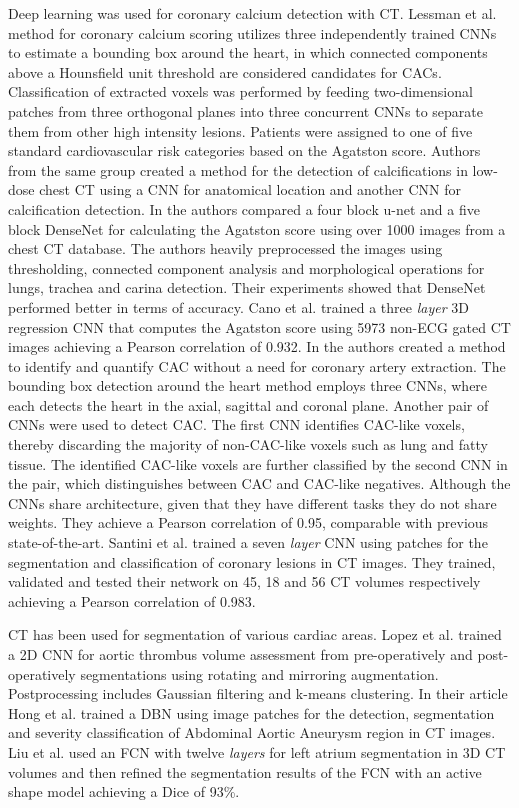 \documentclass[journal]{IEEEtran}
\begin{document}
Deep learning was used for coronary calcium detection with CT.
Lessman et al.\cite{lessmann2016deep} method for coronary calcium scoring utilizes three independently trained CNNs to estimate a bounding box around the heart, in which connected components above a Hounsfield unit threshold are considered candidates for CACs.
Classification of extracted voxels was performed by feeding two-dimensional patches from three orthogonal planes into three concurrent CNNs to separate them from other high intensity lesions.
Patients were assigned to one of five standard cardiovascular risk categories based on the Agatston score.
Authors from the same group created a method\cite{lessmann2017automatic} for the detection of calcifications in low-dose chest CT using a CNN for anatomical location and another CNN for calcification detection.
In\cite{shadmi2018fully} the authors compared a four block u-net and a five block DenseNet for calculating the Agatston score using over 1000 images from a chest CT database.
The authors heavily preprocessed the images using thresholding, connected component analysis and morphological operations for lungs, trachea and carina detection.
Their experiments showed that DenseNet performed better in terms of accuracy.
Cano et al.\cite{cano2018automated} trained a three \textit{layer} 3D regression CNN that computes the Agatston score using 5973 non-ECG gated CT images achieving a Pearson correlation of 0.932.
In\cite{wolterink2016automatic} the authors created a method to identify and quantify CAC without a need for coronary artery extraction.
The bounding box detection around the heart method employs three CNNs, where each detects the heart in the axial, sagittal and coronal plane.
Another pair of CNNs were used to detect CAC\@.
The first CNN identifies CAC-like voxels, thereby discarding the majority of non-CAC-like voxels such as lung and fatty tissue.
The identified CAC-like voxels are further classified by the second CNN in the pair, which distinguishes between CAC and CAC-like negatives.
Although the CNNs share architecture, given that they have different tasks they do not share weights.
They achieve a Pearson correlation of 0.95, comparable with previous state-of-the-art.
Santini et al.\cite{santini2017automatic} trained a seven \textit{layer} CNN using patches for the segmentation and classification of coronary lesions in CT images.
They trained, validated and tested their network on 45, 18 and 56 CT volumes respectively achieving a Pearson correlation of 0.983.

CT has been used for segmentation of various cardiac areas.
Lopez et al.\cite{lopez2017dcnn} trained a 2D CNN for aortic thrombus volume assessment from pre-operatively and post-operatively segmentations using rotating and mirroring augmentation.
Postprocessing includes Gaussian filtering and k-means clustering.
In their article Hong et al.\cite{hong2016automatic} trained a DBN using image patches for the detection, segmentation and severity classification of Abdominal Aortic Aneurysm region in CT images.
Liu et al.\cite{liu2017left} used an FCN with twelve \textit{layers} for left atrium segmentation in 3D CT volumes and then refined the segmentation results of the FCN with an active shape model achieving a Dice of 93\%.
\end{document}
